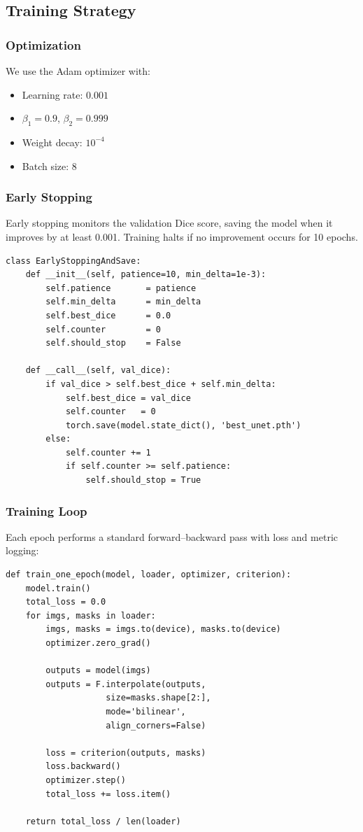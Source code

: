 \documentclass[a4paper, journal]{IEEEtran}
\begin{document}
\subsection{Training Strategy}

\subsubsection{Optimization}
We use the Adam optimizer with:
\begin{itemize}
    \item Learning rate: $\!0.001$
    \item $\beta_1 = 0.9$, $\beta_2 = 0.999$
    \item Weight decay: $10^{-4}$
    \item Batch size: 8
\end{itemize}

\subsubsection{Early Stopping}
Early stopping monitors the validation Dice score, saving the model when it improves by at least 0.001. Training halts if no improvement occurs for 10 epochs.

\begin{lstlisting}[caption={Early Stopping Callback}]
class EarlyStoppingAndSave:
    def __init__(self, patience=10, min_delta=1e-3):
        self.patience       = patience
        self.min_delta      = min_delta
        self.best_dice      = 0.0
        self.counter        = 0
        self.should_stop    = False

    def __call__(self, val_dice):
        if val_dice > self.best_dice + self.min_delta:
            self.best_dice = val_dice
            self.counter   = 0
            torch.save(model.state_dict(), 'best_unet.pth')
        else:
            self.counter += 1
            if self.counter >= self.patience:
                self.should_stop = True
\end{lstlisting}

\subsubsection{Training Loop}
Each epoch performs a standard forward–backward pass with loss and metric logging:

\begin{lstlisting}[caption={Training One Epoch}]
def train_one_epoch(model, loader, optimizer, criterion):
    model.train()
    total_loss = 0.0
    for imgs, masks in loader:
        imgs, masks = imgs.to(device), masks.to(device)
        optimizer.zero_grad()

        outputs = model(imgs)
        outputs = F.interpolate(outputs,
                    size=masks.shape[2:],
                    mode='bilinear',
                    align_corners=False)

        loss = criterion(outputs, masks)
        loss.backward()
        optimizer.step()
        total_loss += loss.item()

    return total_loss / len(loader)
\end{lstlisting}
\end{document}
